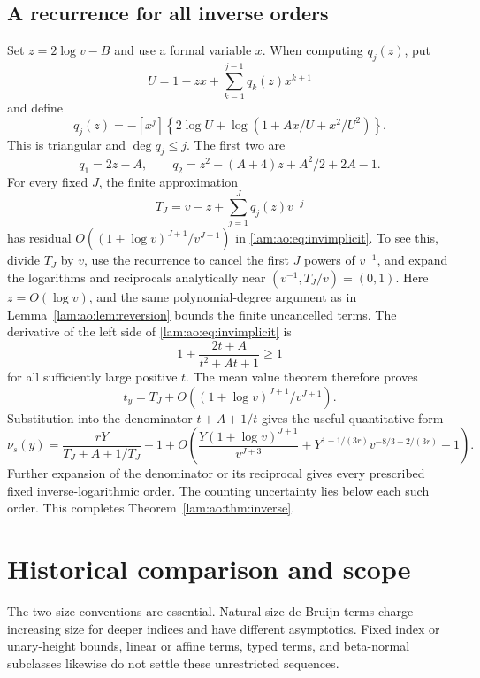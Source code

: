 \documentclass[11pt,a4paper]{article}
\numberwithin{equation}{section}
\theoremstyle{remark}
\begin{document}
\subsection{A recurrence for all inverse orders}
Set $z=2\log v-B$ and use a formal variable $x$. When computing $q_j(z)$, put
\[
 U=1-zx+\sum_{k=1}^{j-1}q_k(z)x^{k+1}
\]
and define
\begin{equation}\label{lam:ao:eq:q}
 q_j(z)=-[x^j]\left\{2\log U+\log(1+Ax/U+x^2/U^2)\right\}.
\end{equation}
This is triangular and $\deg q_j\le j$. The first two are
\[
 q_1=2z-A,\qquad
 q_2=z^2-(A+4)z+A^2/2+2A-1.
\]
For every fixed $J$, the finite approximation
\begin{equation}\label{lam:ao:eq:Tinv}
 T_J=v-z+\sum_{j=1}^Jq_j(z)v^{-j}
\end{equation}
has residual $O((1+\log v)^{J+1}/v^{J+1})$ in \eqref{lam:ao:eq:invimplicit}. To see this, divide $T_J$ by $v$, use the recurrence to cancel the first $J$ powers of $v^{-1}$, and expand the logarithms and reciprocals analytically near $(v^{-1},T_J/v)=(0,1)$. Here $z=O(\log v)$, and the same polynomial-degree argument as in Lemma~\ref{lam:ao:lem:reversion} bounds the finite uncancelled terms. The derivative of the left side of \eqref{lam:ao:eq:invimplicit} is
\[
 1+\frac{2t+A}{t^2+At+1}\ge1
\]
for all sufficiently large positive $t$. The mean value theorem therefore proves
\[
 t_y=T_J+O((1+\log v)^{J+1}/v^{J+1}).
\]
Substitution into the denominator $t+A+1/t$ gives the useful quantitative form
\begin{equation}\label{lam:ao:eq:invarbitrary}
 \nu_s(y)=\frac{rY}{T_J+A+1/T_J}-1
 +O\!\left(\frac{Y(1+\log v)^{J+1}}{v^{J+3}}
       +Y^{1-1/(3r)}v^{-8/3+2/(3r)}+1\right).
\end{equation}
Further expansion of the denominator or its reciprocal gives every prescribed fixed inverse-logarithmic order. The counting uncertainty lies below each such order. This completes Theorem~\ref{lam:ao:thm:inverse}.

\section{Historical comparison and scope}\label{lam:ao:sec:scope}
The two size conventions are essential. Natural-size de Bruijn terms charge increasing size for deeper indices and have different asymptotics. Fixed index or unary-height bounds, linear or affine terms, typed terms, and beta-normal subclasses likewise do not settle these unrestricted sequences.
\end{document}
